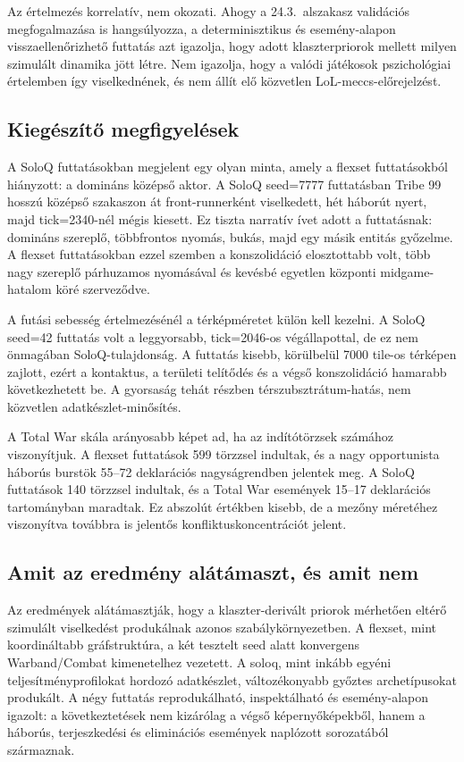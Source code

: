Az értelmezés korrelatív, nem okozati. Ahogy a 24.3.~alszakasz validációs megfogalmazása is hangsúlyozza, a determinisztikus és esemény-alapon visszaellenőrizhető futtatás azt igazolja, hogy adott klaszterpriorok mellett milyen szimulált dinamika jött létre. Nem igazolja, hogy a valódi játékosok pszichológiai értelemben így viselkednének, és nem állít elő közvetlen LoL-meccs-előrejelzést.

\subsection*{Kiegészítő megfigyelések}

A SoloQ futtatásokban megjelent egy olyan minta, amely a flexset futtatásokból hiányzott: a domináns középső aktor. A SoloQ seed=7777 futtatásban Tribe 99 hosszú középső szakaszon át front-runnerként viselkedett, hét háborút nyert, majd tick=2340-nél mégis kiesett. Ez tiszta narratív ívet adott a futtatásnak: domináns szereplő, többfrontos nyomás, bukás, majd egy másik entitás győzelme. A flexset futtatásokban ezzel szemben a konszolidáció elosztottabb volt, több nagy szereplő párhuzamos nyomásával és kevésbé egyetlen központi midgame-hatalom köré szerveződve.

A futási sebesség értelmezésénél a térképméretet külön kell kezelni. A SoloQ seed=42 futtatás volt a leggyorsabb, tick=2046-os végállapottal, de ez nem önmagában SoloQ-tulajdonság. A futtatás kisebb, körülbelül 7000 tile-os térképen zajlott, ezért a kontaktus, a területi telítődés és a végső konszolidáció hamarabb következhetett be. A gyorsaság tehát részben térszubsztrátum-hatás, nem közvetlen adatkészlet-minősítés.

A Total War skála arányosabb képet ad, ha az indítótörzsek számához viszonyítjuk. A flexset futtatások 599 törzzsel indultak, és a nagy opportunista háborús burstök 55--72 deklarációs nagyságrendben jelentek meg. A SoloQ futtatások 140 törzzsel indultak, és a Total War események 15--17 deklarációs tartományban maradtak. Ez abszolút értékben kisebb, de a mezőny méretéhez viszonyítva továbbra is jelentős konfliktuskoncentrációt jelent.

\subsection*{Amit az eredmény alátámaszt, és amit nem}

Az eredmények alátámasztják, hogy a klaszter-derivált priorok mérhetően eltérő szimulált viselkedést produkálnak azonos szabálykörnyezetben. A flexset, mint koordináltabb gráfstruktúra, a két tesztelt seed alatt konvergens Warband/Combat kimenetelhez vezetett. A soloq, mint inkább egyéni teljesítményprofilokat hordozó adatkészlet, változékonyabb győztes archetípusokat produkált. A négy futtatás reprodukálható, inspektálható és esemény-alapon igazolt: a következtetések nem kizárólag a végső képernyőképekből, hanem a háborús, terjeszkedési és eliminációs események naplózott sorozatából származnak.

